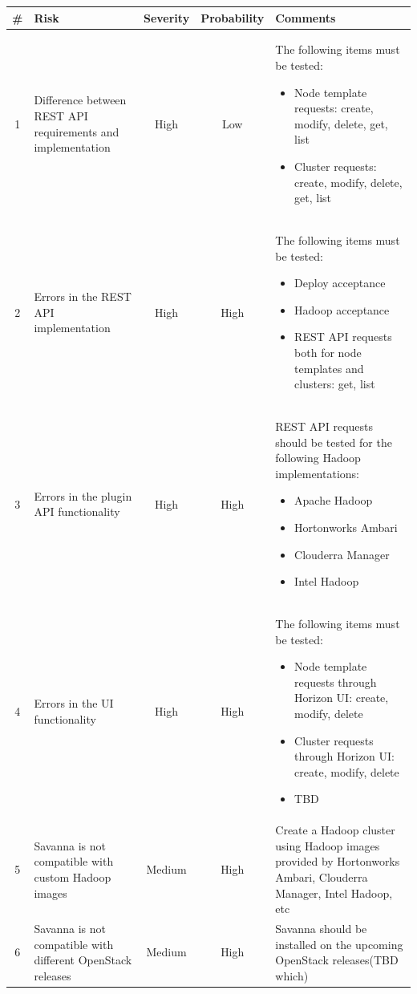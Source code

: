 \documentclass[a4paper,11pt]{article}
\begin{document}
\newpage
\begin{longtable}{|c|p{3cm}|c|c|p{8cm}|}
\hline
\# & {\bf Risk} & {\bf Severity} & {\bf Probability} & {\bf Comments}\\
\hline
1&Difference between REST API requirements and implementation& High & Low & The following items must be tested:
\begin{itemize}
\item Node template requests: create, modify, delete, get, list
\item Cluster requests: create, modify, delete, get, list
\end{itemize}
\\ \hline
2&Errors in the REST API implementation& High & High & The following items must be tested:
\begin{itemize}
\item Deploy acceptance
\item Hadoop acceptance
\item REST API requests both for node templates and clusters: get, list
\end{itemize}
\\ \hline
3&Errors in the plugin API functionality & High & High & REST API requests should be tested for the following Hadoop implementations:
\begin{itemize}
\item Apache Hadoop
\item Hortonworks Ambari
\item Clouderra Manager
\item Intel Hadoop
\end{itemize}
\\ \hline
4&Errors in the UI functionality & High & High & The following items must be tested:
\begin{itemize}
\item Node template requests through Horizon UI: create, modify, delete
\item Cluster requests through Horizon UI: create, modify, delete
\item TBD
\end{itemize}
\\ \hline
5&Savanna is not compatible with custom Hadoop images & Medium & High & Create a Hadoop cluster using Hadoop images provided by Hortonworks Ambari, 
Clouderra Manager, Intel Hadoop, etc \\ \hline
6&Savanna is not compatible with different OpenStack releases& Medium & High & Savanna should be installed on the upcoming OpenStack releases(TBD which) \\ \hline

\end{longtable}
\end{document}
